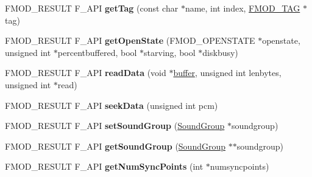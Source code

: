 \begin{DoxyCompactItemize}
\item 
\hypertarget{class_f_m_o_d_1_1_sound_abb0b254a45594e485e95ed4eab9fd1b3}{F\+M\+O\+D\+\_\+\+R\+E\+S\+U\+L\+T F\+\_\+\+A\+P\+I {\bfseries get\+Tag} (const char $\ast$name, int index, \hyperlink{struct_f_m_o_d___t_a_g}{F\+M\+O\+D\+\_\+\+T\+A\+G} $\ast$tag)}\label{class_f_m_o_d_1_1_sound_abb0b254a45594e485e95ed4eab9fd1b3}

\item 
\hypertarget{class_f_m_o_d_1_1_sound_a2c3115f9bd9343b7d3b09b2e4edbb8b3}{F\+M\+O\+D\+\_\+\+R\+E\+S\+U\+L\+T F\+\_\+\+A\+P\+I {\bfseries get\+Open\+State} (F\+M\+O\+D\+\_\+\+O\+P\+E\+N\+S\+T\+A\+T\+E $\ast$openstate, unsigned int $\ast$percentbuffered, bool $\ast$starving, bool $\ast$diskbusy)}\label{class_f_m_o_d_1_1_sound_a2c3115f9bd9343b7d3b09b2e4edbb8b3}

\item 
\hypertarget{class_f_m_o_d_1_1_sound_af58de66a892b9e49a513502288cf930b}{F\+M\+O\+D\+\_\+\+R\+E\+S\+U\+L\+T F\+\_\+\+A\+P\+I {\bfseries read\+Data} (void $\ast$\hyperlink{structbuffer}{buffer}, unsigned int lenbytes, unsigned int $\ast$read)}\label{class_f_m_o_d_1_1_sound_af58de66a892b9e49a513502288cf930b}

\item 
\hypertarget{class_f_m_o_d_1_1_sound_ac73572153744ba36367391939cd3bc5e}{F\+M\+O\+D\+\_\+\+R\+E\+S\+U\+L\+T F\+\_\+\+A\+P\+I {\bfseries seek\+Data} (unsigned int pcm)}\label{class_f_m_o_d_1_1_sound_ac73572153744ba36367391939cd3bc5e}

\item 
\hypertarget{class_f_m_o_d_1_1_sound_a6433c4494cbb472ef1d9cf214749dc01}{F\+M\+O\+D\+\_\+\+R\+E\+S\+U\+L\+T F\+\_\+\+A\+P\+I {\bfseries set\+Sound\+Group} (\hyperlink{class_f_m_o_d_1_1_sound_group}{Sound\+Group} $\ast$soundgroup)}\label{class_f_m_o_d_1_1_sound_a6433c4494cbb472ef1d9cf214749dc01}

\item 
\hypertarget{class_f_m_o_d_1_1_sound_a146bf9b59d99685b313f95e3460a4b8b}{F\+M\+O\+D\+\_\+\+R\+E\+S\+U\+L\+T F\+\_\+\+A\+P\+I {\bfseries get\+Sound\+Group} (\hyperlink{class_f_m_o_d_1_1_sound_group}{Sound\+Group} $\ast$$\ast$soundgroup)}\label{class_f_m_o_d_1_1_sound_a146bf9b59d99685b313f95e3460a4b8b}

\item 
\hypertarget{class_f_m_o_d_1_1_sound_a3a8c9fd2fb487a3b3a66952f09840fbf}{F\+M\+O\+D\+\_\+\+R\+E\+S\+U\+L\+T F\+\_\+\+A\+P\+I {\bfseries get\+Num\+Sync\+Points} (int $\ast$numsyncpoints)}\label{class_f_m_o_d_1_1_sound_a3a8c9fd2fb487a3b3a66952f09840fbf}


\end{DoxyCompactItemize}
